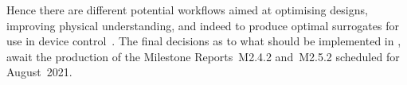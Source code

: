 Hence there are different potential workflows aimed at optimising designs, improving physical
understanding, and indeed to produce optimal surrogates for use in device control~\cite{bruntonkutz}.
The final decisions as to what should be implemented in \nep, await the production
of the Milestone Reports~M2.4.2 and~M2.5.2 scheduled for August~2021.
